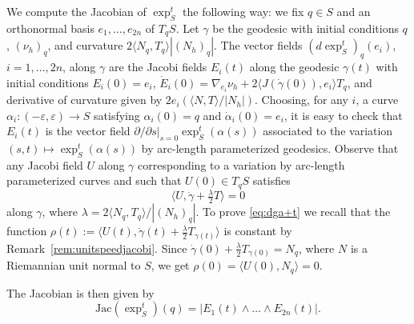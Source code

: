 \documentclass[10pt]{amsart}
\theoremstyle{definition}
\theoremstyle{remark}
\numberwithin{equation}{section}
\begin{document}
We compute the Jacobian of $\exp_S^t$ the following way: we fix $q\in S$ and an orthonormal basis $e_1,\ldots,e_{2n}$ of $T_qS$. Let ${\gamma}$ be the geodesic with initial conditions $q$, $({\nu_{h}})_q$, and curvature $2{\langle{N_q,T_q}\rangle}|(N_h)_q|$. The vector fields $(d\exp_S^t)_q(e_i)$, $i=1,\ldots,2n$, along ${\gamma}$ are the Jacobi fields $E_i(t)$ along the geodesic ${\gamma}(t)$ with initial conditions $E_i(0)=e_i$, $\dot{E}_i(0)=\nabla_{e_i}{\nu_{h}}+2{\langle{J({\dot{\gamma}}(0)),e_i}\rangle}T_q$, and derivative of curvature given by $2e_i({\langle{N,T}\rangle}/|N_h|)$. Choosing, for any $i$, a curve $\alpha_i:(-{\varepsilon},{\varepsilon})\to S$ satisfying $\alpha_i(0)=q$ and $\dot{\alpha}_i(0)=e_i$, it is easy to check that $E_i(t)$ is the vector field ${\partial}/{\partial} s|_{s=0} \exp^t_S(\alpha(s))$ associated to the variation $(s,t)\mapsto \exp_S^t(\alpha(s))$ by arc-length parameterized geodesics. Observe that any Jacobi field $U$ along ${\gamma}$ corresponding to a variation by arc-length parameterized curves and such that $U(0)\in T_qS$ satisfies
\begin{equation}
\label{eq:dga+t}
{\langle{U,{\dot{\gamma}}+\tfrac{\lambda}{2}T}\rangle}=0
\end{equation}
along ${\gamma}$, where ${\lambda}=2{\langle{N_q,T_q}\rangle}/|(N_h)_q|$. To prove \eqref{eq:dga+t} we recall that the function $\rho(t):={\langle{U(t),{\dot{\gamma}}(t)+\tfrac{\lambda}{2}T_{{\gamma}(t)}}\rangle}$ is constant by Remark~\ref{rem:unitspeedjacobi}. Since ${\dot{\gamma}}(0)+\tfrac{\lambda}{2}T_{{\gamma}(0)}=N_q$, where $N$ is a Riemannian unit normal to $S$, we get $\rho(0)={\langle{U(0),N_q}\rangle}=0$.

The Jacobian is then given by
\[
\text{Jac}(\exp_S^t)(q)=|E_1(t)\wedge\ldots\wedge E_{2n}(t)|.
\]
\end{document}

